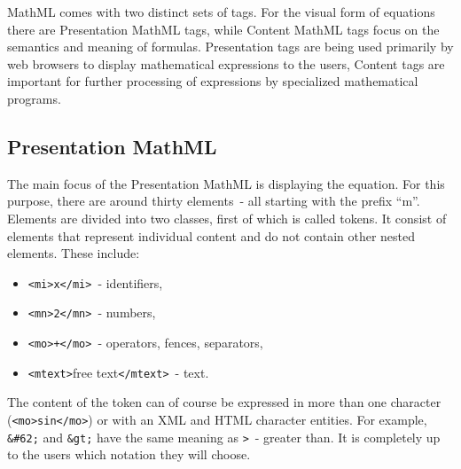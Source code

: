\documentclass[11pt,oneside,final]{fithesis2}
\begin{document}
MathML comes with two distinct sets of tags. For the visual form of equations there are Presentation MathML tags, while Content MathML tags focus on the semantics and meaning of formulas. Presentation tags are being used primarily by web browsers to display mathematical expressions to the users, Content tags are important for further processing of expressions by specialized mathematical programs.

\subsection{Presentation MathML}
The main focus of the Presentation MathML is displaying the equation. For this purpose, there are around thirty elements~- all starting with the prefix “m”. Elements are divided into two classes, first of which is called tokens. It consist of elements that represent individual content and do not contain other nested elements. These include: 
\begin{itemize}
\item \texttt{<mi>x</mi>}~- identifiers,
\item \texttt{<mn>2</mn>}~- numbers,
\item \texttt{<mo>+</mo>}~- operators, fences, separators,
\item \texttt{<mtext>}free text\texttt{</mtext>}~- text.
\end{itemize}
The content of the token can of course be expressed in more than one character (\texttt{<mo>sin</mo>}) or with an XML and HTML character entities. For example, \texttt{\&\#62;} and \texttt{\&gt;} have the same meaning as \texttt{>}~- greater than. It is completely up to the users which notation they will choose.
\end{document}

